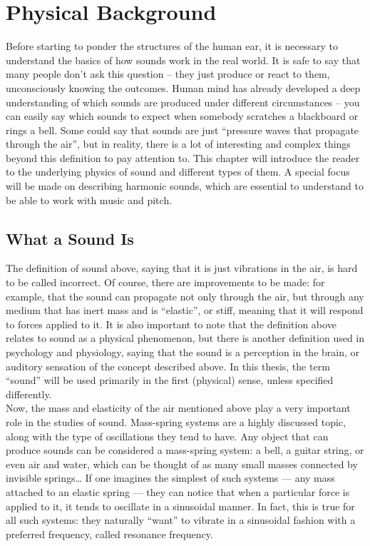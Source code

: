 \chapter{Physical Background}

Before starting to ponder the structures of the human ear, it is necessary to understand the basics of how sounds work in the real world. It is safe to say that many people don’t ask this question – they just produce or react to them, unconsciously knowing the outcomes. Human mind has already developed a deep understanding of which sounds are produced under different circumstances – you can easily say which sounds to expect when somebody scratches a blackboard or rings a bell. Some could say that sounds are just “pressure waves that propagate through the air”, but in reality, there is a lot of interesting and complex things beyond this definition to pay attention to. This chapter will introduce the reader to the underlying physics of sound and different types of them. A special focus will be made on describing harmonic sounds, which are essential to understand to be able to work with music and pitch.\\

\section{What a Sound Is}

The definition of sound above, saying that it is just vibrations in the air, is hard to be called incorrect. Of course, there are improvements to be made: for example, that the sound can propagate not only through the air, but through any medium that has inert mass and is “elastic”, or stiff, meaning that it will respond to forces applied to it. It is also important to note that the definition above relates to sound as a physical phenomenon, but there is another definition used in psychology and physiology, saying that the sound is a perception in the brain, or auditory sensation of the concept described above. In this thesis, the term “sound” will be used primarily in the first (physical) sense, unless specified differently.\\

Now, the mass and elasticity of the air mentioned above play a very important role in the studies of sound. Mass-spring systems are a highly discussed topic, along with the type of oscillations they tend to have. Any object that can produce sounds can be considered a mass-spring system: a bell, a guitar string, or even air and water, which can be thought of as many small masses connected by invisible springs\dots{} If one imagines the simplest of such systems --- any mass attached to an elastic spring --- they can notice that when a particular force is applied to it, it tends to oscillate in a sinusoidal manner. In fact, this is true for all such systems: they naturally “want” to vibrate in a sinusoidal fashion with a preferred frequency, called resonance frequency.\\

